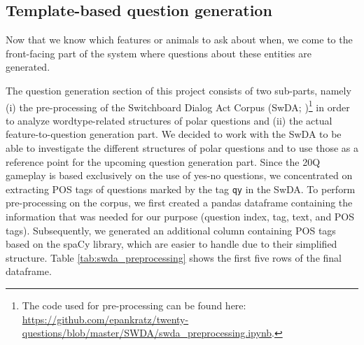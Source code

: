 \documentclass[11pt,a4paper]{article}
\begin{document}
\subsection{Template-based question generation}
\label{subsec:qg}

Now that we know which features or animals to ask about when, we come to the front-facing part of the system where questions about these entities are generated.


The question generation section of this project consists of two sub-parts, namely (i) the pre-processing of the Switchboard Dialog Act Corpus (SwDA; \citealt{JurafskyEa1997,ShribergEa1998,StolckeEa2000})\footnote{The code used for pre-processing can be found here:  \url{https://github.com/epankratz/twenty-questions/blob/master/SWDA/swda_preprocessing.ipynb}.} in order to analyze wordtype-related structures of polar questions and (ii) the actual feature-to-question generation part. 
We decided to work with the SwDA to be able to investigate the different structures of polar questions and to use those as a reference point for the upcoming question generation part. Since the 20Q gameplay is based exclusively on the use of yes-no questions, we concentrated on extracting POS tags of questions marked by the tag \texttt{qy} in the SwDA. To perform pre-processing on the corpus, we first created a pandas dataframe containing the information that was needed for our purpose (question index, tag, text, and POS tags). Subsequently, we generated an additional column containing POS tags based on the spaCy library, which are easier to handle due to their simplified structure. 
Table \ref{tab:swda_preprocessing} shows the first five rows of the final dataframe.
\end{document}
